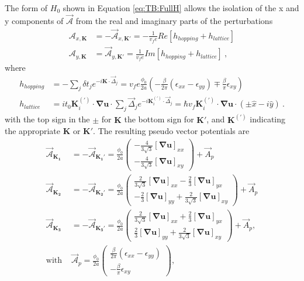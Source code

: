 The form of $H_0$ shown in Equation \ref{eq:TB:FullH} allows the isolation of the x and y components of $\vec{\mathcal{A}}$ from the real and imaginary parts of the perturbations
\begin{align}
  \mathcal{A}_{x,\bm{K}}&=-\vec{\mathcal{A}}_{x,\bm{K'}}=-\frac{1}{v_f e} Re[h_{hopping}+h_{lattice}] \nonumber \\
  \mathcal{A}_{y,\bm{K}}&=\vec{\mathcal{A}}_{y,\bm{K'}}= \frac{1}{v_f e} Im[h_{hopping}+h_{lattice}] \label{eq:PVP:AfromH}\ ,
\end{align}
where 
\begin{align}
  h_{hopping}&=-\sum_{j} \delta t_j e^{-i \bm{K} \cdot \vec{\Delta}_j}=
    v_f e \frac{\phi_0}{2a} \left(- \frac{\beta}{2 \pi} (\epsilon_{xx}-\epsilon_{yy})
    \mp \frac{\beta}{\pi} \epsilon_{xy} \right) \nonumber \\
  h_{lattice}&=i t_0  \bm{K}_i^{(')} \cdot \bm{\nabla u} \cdot \sum_{j} \vec{\Delta}_j e^{-i \bm{K}_i^{(')} \cdot \vec{\Delta}_j}
    =\hbar v_f \bm{K}_i^{(')}\cdot \bm{\nabla u} \cdot \left( \pm \hat{x}-i \hat{y}\right)  \label{eq:PVP:nocurl} \ .
\end{align}
with the top sign in the $\pm$ for $\bm{K}$ the bottom sign for $\bm{K'}$, and $\bm{K}^{(')}$ indicating the appropriate $\bm{K}$ or $\bm{K'}$.
The resulting pseudo vector potentials are
\begin{align}
  \vec{\mathcal{A}}_{\bm{K_1}}&=-\vec{\mathcal{A}}_{\bm{K_1'}}=
    \frac{\phi_0}{2a} \left( \begin{array}{c} 
      -\frac{4}{3\sqrt{3}} [\bm{\nabla u}]_{xx} \\ 
      -\frac{4}{3\sqrt{3}} [\bm{\nabla u}]_{xy}
    \end{array} \right) +\vec{A}_p \nonumber \\ 
  \vec{\mathcal{A}}_{\bm{K_2}}&=-\vec{\mathcal{A}}_{\bm{K_2'}}=
    \frac{\phi_0}{2a} \left( \begin{array}{c} 
      \frac{2}{3\sqrt{3}}[\bm{\nabla u}]_{xx}-\frac{2}{3} [\bm{\nabla u}]_{yx} \\
      -\frac{2}{3} [\bm{\nabla u}]_{yy}+\frac{2}{3 \sqrt{3}} [\bm{\nabla u}]_{xy}
    \end{array} \right)+\vec{A}_p  \nonumber \\
  \vec{\mathcal{A}}_{\bm{K_3}}&=-\vec{\mathcal{A}}_{\bm{K_3'}}=
    \frac{\phi_0}{2a} \left( \begin{array}{c}
      \frac{2}{3\sqrt{3}}[\bm{\nabla u}]_{xx}+\frac{2}{3} [\bm{\nabla u}]_{yx} \\
      \frac{2}{3} [\bm{\nabla u}]_{yy}+\frac{2}{3 \sqrt{3}} [\bm{\nabla u}]_{xy}
    \end{array} \right)+\vec{A}_p  , \nonumber \\
  \textrm{with }
  &\vec{\mathcal{A}}_p= 
    \frac{\phi_0}{2a} \left( \begin{array}{c} 
      \frac{\beta }{2 \pi} (\epsilon_{xx}-\epsilon_{yy}) \\
      -\frac{\beta}{\pi} \epsilon_{xy}
    \end{array} \right),
  \label{eq:PVP:PVP}
\end{align}
